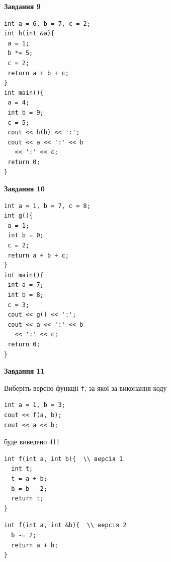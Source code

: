 \documentclass[12pt, ukrainian]{article}
\def\code#1{\Verb!#1!}
\begin{document}
{\begin {large}
\begin{minipage}[t]{11.0cm}
\end{minipage}


\begin{minipage}[t]{7.0cm}

\begin{center}
\textbf{Завдання 9}
\end{center}
\vspace{-8mm}

\begin{verbatim}
int a = 6, b = 7, c = 2;
int h(int &a){
 a = 1;
 b *= 5;
 c = 2;
 return a + b + c;
}
int main(){
 a = 4;
 int b = 9;
 c = 5;
 cout << h(b) << ':';
 cout << a << ':' << b 
   << ':' << c;
 return 0;
}
\end{verbatim}



\begin{center}
\textbf{Завдання 10}
\end{center}
\vspace{-8mm}

\begin{verbatim}
int a = 1, b = 7, c = 8;
int g(){
 a = 1;
 int b = 0;
 c = 2;
 return a + b + c;
}
int main(){
 int a = 7;
 int b = 8;
 c = 3;
 cout << g() << ':';
 cout << a << ':' << b 
   << ':' << c;
 return 0;
}
\end{verbatim}

\end{minipage}
\vline \hspace{1mm}
\begin{minipage}[t]{11.0cm}

\begin{center}
\textbf{Завдання 11}
\end{center}
Виберіть версію функції \code{f}, за якої за виконання коду
\begin{verbatim}
int a = 1, b = 3;
cout << f(a, b);
cout << a << b;
\end{verbatim}

буде виведено 411

\begin{verbatim}
int f(int a, int b){  \\ версія 1
  int t;
  t = a + b;
  b = b - 2;
  return t;
}
\end{verbatim}

\vspace{-8mm}\begin{verbatim}
int f(int a, int &b){  \\ версія 2
  b -= 2;
  return a + b;
}
\end{verbatim}


\end{minipage}
\end{large}}
\end{document}
